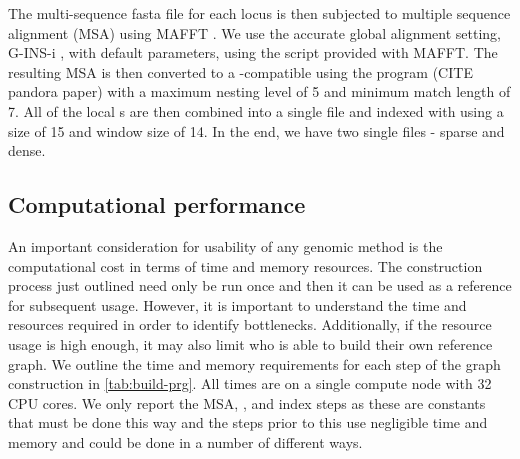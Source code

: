 The multi-sequence fasta file for each locus is then subjected to multiple sequence alignment (MSA) using MAFFT \cite{nakamura2018}. We use the accurate global alignment setting, G-INS-i \cite{katoh2016}, with default parameters, using the  script provided with MAFFT. The resulting MSA is then converted to a \pandora{}-compatible \prg{} using the \makeprg{} program (CITE pandora paper) with a maximum nesting level of 5 and minimum match length of 7. All of the local \prg{}s are then combined into a single \prg{} file and indexed with \pandora{} using a \kmer{} size of 15 and window size of 14. In the end, we have two single \prg{} files - sparse and dense.

\subsection{Computational performance}

An important consideration for usability of any genomic method is the computational cost in terms of time and memory resources. The construction process just outlined need only be run once and then it can be used as a reference for subsequent \pandora{} usage. However, it is important to understand the time and resources required in order to identify bottlenecks. Additionally, if the resource usage is high enough, it may also limit who is able to build their own reference graph. We outline the time and memory requirements for each step of the graph construction in \autoref{tab:build-prg}. All times are on a single compute node with 32 CPU cores. We only report the MSA, \makeprg{}, and \pandora{} index steps as these are constants that must be done this way and the steps prior to this use negligible time and memory and could be done in a number of different ways.

